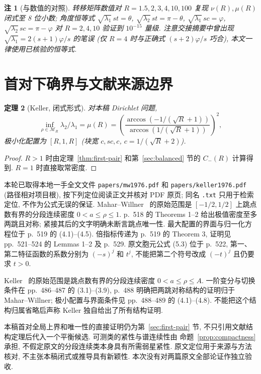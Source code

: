 \documentclass[UTF8]{ctexart}
\newtheorem{theorem}{定理}[section]
\newtheorem{remark}[theorem]{注}
\begin{document}
\begin{remark}[与数值的对照]
转移矩阵数值对 $R = 1.5, 2, 3, 4, 10, 100$ 复现 $\nu(R), \mu(R)$ 闭式至 8 位小数;
角度恒等式 $\sqrt{\lambda_1}\,st = \theta$, $\sqrt{\lambda_2}\,st = \pi-\theta$,
$\sqrt{\lambda_1}\,sc = \varphi$, $\sqrt{\lambda_2}\,sc = \pi-\varphi$ 对 $R = 2, 4, 10$
验证到 $10^{-15}$ 量级. 注意交接摘要中曾出现 $\sqrt{\lambda_1} = 2(s+1)\varphi/s$ 的笔误
(仅 $R = 4$ 时与正确式 $(s+2)\varphi/s$ 巧合), 本文一律使用已核验的恒等式.
\end{remark}

\section{首对下确界与文献来源边界}

\begin{theorem}[Keller, 闭式形式]
对本稿 Dirichlet 问题,
\[
 \inf_{\rho\in\mathcal M_R}\lambda_2/\lambda_1=\mu(R)
 =\left(\frac{\arccos(-1/(\sqrt R+1))}{\arccos(1/(\sqrt R+1))}\right)^2,
\]
极小化配置为 $[R, 1, R]$ (块宽 $c, sc, c$, $c = 1/(\sqrt{R}+2)$).
\end{theorem}

\begin{proof}
$R>1$ 时由定理~\ref{thm:first-pair} 和第~\ref{sec:balanced} 节的 $C_-(R)$ 计算得到.
$R=1$ 时直接取常密度.
\end{proof}

本轮已取得本地一手全文文件 \texttt{papers/mw1976.pdf} 和
\texttt{papers/keller1976.pdf} (路径相对项目根), 按下列定位阅读正文并核对 PDF 原页;
同名 \texttt{.txt} 只用于检索定位, 不作为公式无误的保证.
Mahar--Willner~\cite[pp.~517--518, Sections 1--3]{mw} 的原始范围是
$[-1/2,1/2]$ 上跳点数有界的分段连续密度 $0<a\leq\rho\leq1$.
p.~518 的 Theorems 1--2 给出极值密度至多两跳且对称;
紧接其后的文字明确未断言跳点唯一性.
最大配置的界面与归一化方程位于 p.~519 的 (4.1)--(4.5).
倍指标传递为 p.~519 的 Theorem 3, 证明见 pp.~521--524 的 Lemmas 1--2
及 p.~529. 原文胞元公式 (5.3) 位于 p.~522, 第一、第二特征函数的系数分别为
$(-s)^j$ 和 $t^j$, 不能把第二个符号改成 $(-t)^j$ 且仍要求 $t>0$.

Keller~\cite[p.~485, (1.1)--(2.1)]{keller} 的原始范围是跳点数有界的分段连续密度
$0<a\leq\rho\leq A$. 一阶变分与切换条件在 pp.~486--487 的 (3.1)--(3.9),
p.~488 明确把两跳对称结构的证明归于 Mahar--Willner;
极小配置与界面条件见 pp.~488--489 的 (4.1)--(4.8).
不能把这个结构归属省略后声称 Keller 独自给出了所有结构证明.

本稿首对全局上界和唯一性的直接证明仍为第~\ref{sec:first-pair} 节,
不只引用文献结构定理后代入一个平衡候选. 可测类的紧性与谱连续性由
命题~\ref{prop:compactness} 承担, 不假定原文的分段连续类本身具有所需弱星紧性.
原文定位用于来源与方法核对, 不主张本稿闭式或推导具有新颖性.
本次没有对两篇原文全部论证作独立验收.
\end{document}
